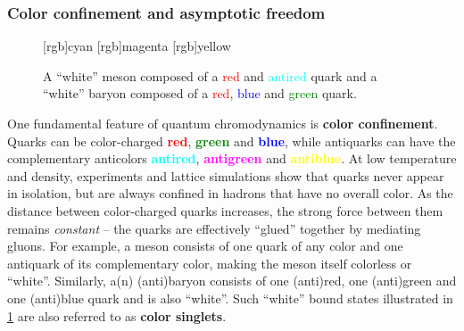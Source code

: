 \subsubsection{Color confinement and asymptotic freedom \cite{ref:quark_bag_model}}

\begin{figure}[t]
\centering
{}
[rgb]{cyan}
[rgb]{magenta}
[rgb]{yellow}
\caption{\label{fig:qcd:colorless_hadrons}%
	A ``white'' meson composed of a \textcolor{red}{red} and \textcolor{cyan}{antired} quark and
	a ``white'' baryon composed of a \textcolor{red}{red}, \textcolor{blue}{blue} and \textcolor{green}{green} quark.
}
\end{figure}

One fundamental feature of quantum chromodynamics is \textbf{color confinement}.
Quarks can be color-charged \textcolor{red}{\textbf{red}}, \textcolor{green}{\textbf{green}} and \textcolor{blue}{\textbf{blue}},
while antiquarks can have the complementary anticolors \textcolor{cyan}{\textbf{antired}}, \textcolor{magenta}{\textbf{antigreen}} and \textcolor{yellow}{\textbf{antiblue}}.
At low temperature and density, experiments and lattice simulations show that quarks never appear in isolation, but are always confined in hadrons that have no overall color.
As the distance between color-charged quarks increases, the strong force between them remains \emph{constant} -- the quarks are  effectively ``glued'' together by mediating gluons.
For example, a meson consists of one quark of any color and one antiquark of its complementary color, making the meson itself colorless or ``white''.
Similarly, a(n) (anti)baryon consists of one (anti)red, one (anti)green and one (anti)blue quark and is also ``white''.
Such ``white'' bound states illustrated in \cref{fig:qcd:colorless_hadrons} are also referred to as \textbf{color singlets}.

